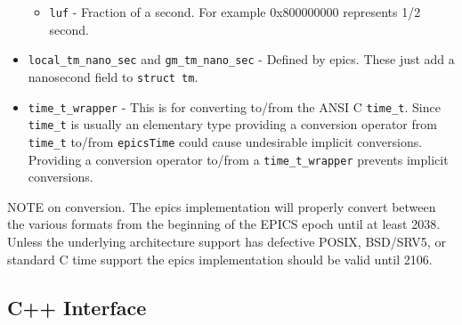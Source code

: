 \begin{itemize}
\begin{itemize}
\item \verb|luf| - Fraction of a second. For example 0x800000000 represents 1/2 second.

\end{itemize}

\item \verb|local_tm_nano_sec| and \verb|gm_tm_nano_sec| - Defined by epics. These just add a nanosecond field to \verb|struct tm|.

\item \verb|time_t_wrapper| - This is for converting to/from the ANSI C \verb|time_t|. Since \verb|time_t| is usually an 
elementary type providing a conversion operator from \verb|time_t| to/from \verb|epicsTime| could cause undesirable 
implicit conversions. Providing a conversion operator to/from a \verb|time_t_wrapper| prevents implicit 
conversions.

\end{itemize}

NOTE on conversion. The epics implementation will properly convert between the various formats from the beginning of 
the EPICS epoch until at least 2038. Unless the underlying architecture support has defective POSIX, BSD/SRV5, or 
standard C time support the epics implementation should be valid until 2106.

\subsection{C++ Interface}

